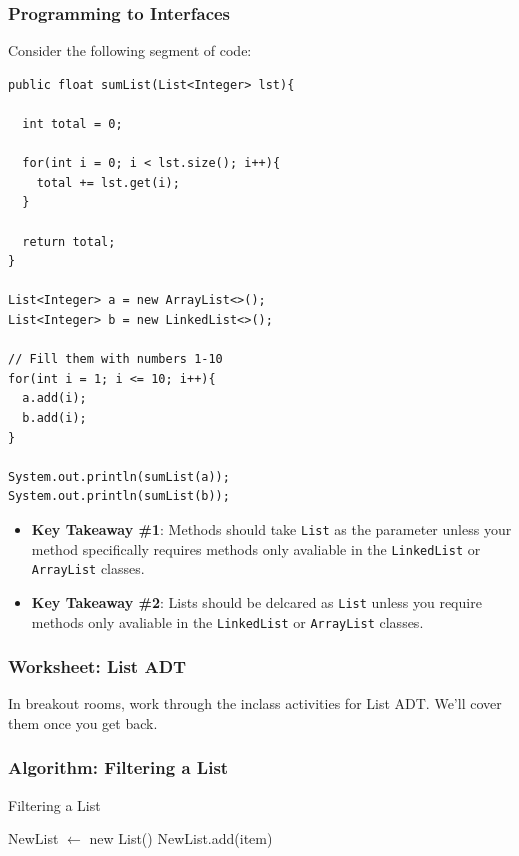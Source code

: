 \documentclass{beamer}
\begin{document}
\begin{frame}[fragile]
    \frametitle{Programming to Interfaces}
    \begin{minipage}{0.49\textwidth}
    Consider the following segment of code:
    \vfill
        \begin{lstlisting}[basicstyle=\tiny, frame=trBL]
public float sumList(List<Integer> lst){

  int total = 0;

  for(int i = 0; i < lst.size(); i++){
    total += lst.get(i);
  }

  return total;
}

List<Integer> a = new ArrayList<>();
List<Integer> b = new LinkedList<>();

// Fill them with numbers 1-10
for(int i = 1; i <= 10; i++){
  a.add(i);
  b.add(i);
}

System.out.println(sumList(a));
System.out.println(sumList(b));
        \end{lstlisting}
    \end{minipage}
    \begin{minipage}{0.49\textwidth}
        \begin{itemize}
            \item \textbf{Key Takeaway \#1}: Methods should take \lstinline|List| as the parameter unless your method specifically requires methods only avaliable in the \lstinline|LinkedList| or \lstinline|ArrayList| classes.
            \item \textbf{Key Takeaway \#2}: Lists should be delcared as \lstinline|List| unless you require methods only avaliable in the \lstinline|LinkedList| or \lstinline|ArrayList| classes.
        \end{itemize}
    \end{minipage}
\end{frame}

\begin{frame}
    \frametitle{Worksheet: List ADT}
    \vfill
    In breakout rooms, work through the inclass activities for List ADT.  We'll cover them once you get back.
    \vfill
\end{frame}


\begin{frame}[fragile]
    \frametitle{Algorithm: Filtering a List}
    \begin{algorithm}[H]
        \caption{Filtering a List}
        \begin{algorithmic}[1]
            \State NewList $\gets$ new List()
            \State NewList.add(item)
            \EndIf
            \EndFor
            \State {}
            \EndProcedure
        \end{algorithmic}
    \end{algorithm}
\end{frame}
\end{document}
